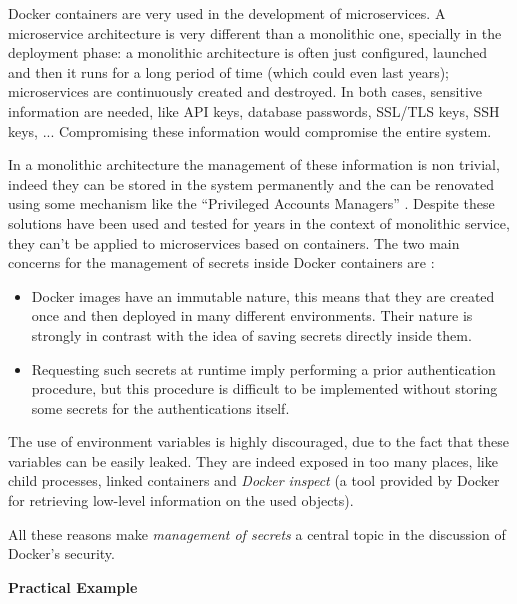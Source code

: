 \documentclass[a4paper,12pt]{article}
\begin{document}
Docker containers are very used in the development of microservices. A
microservice architecture is very different than a monolithic one, specially in
the deployment phase: a monolithic architecture is often just configured,
launched and then it runs for a long period of time (which could even last
years); microservices are continuously created and destroyed. In both cases,
sensitive information are needed, like API keys, database passwords, SSL/TLS
keys, SSH keys, ... Compromising these information would compromise the entire
system. \par In a monolithic architecture the management of these information is
non trivial, indeed they can be stored in the system permanently and the can be
renovated using some mechanism like the ``Privileged Accounts Managers''
\cite{privileged_accounts_managers}. Despite these solutions have been used and
tested for years in the context of monolithic service, they can't be applied to
microservices based on containers. The two main concerns for the management of
secrets inside Docker containers are \cite{secret_management_concerns_docker}:
\begin{itemize}
  \item Docker images have an immutable nature, this means that they are created
  once and then deployed in many different environments. Their nature is
  strongly in contrast with the idea of saving secrets directly inside them.  
  \item Requesting such secrets at runtime imply performing a prior
  authentication procedure, but this procedure is difficult to be implemented
  without storing some secrets for the authentications itself.
\end{itemize}
The use of environment variables is highly discouraged, due to the fact that
these variables can be easily leaked. They are indeed exposed in too many
places, like child processes, linked containers and \textit{Docker inspect} (a
tool provided by Docker for retrieving low-level information on the used
objects).\par All these reasons make \textit{management of secrets} a central
topic in the discussion of Docker's security. 

\bigbreak\textbf{Practical Example}\bigbreak 
\end{document}
